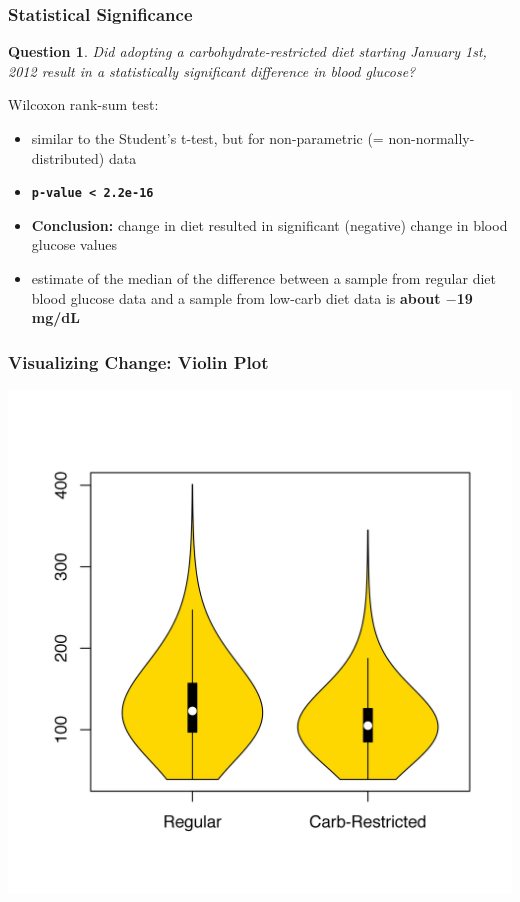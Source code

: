 \documentclass[handout]{beamer}
\newtheorem{question}{Question}
\begin{document}
\begin{frame}
  \frametitle{Statistical Significance}

  \begin{question}
     Did adopting a carbohydrate-restricted diet starting January 1st, 2012 result in a statistically significant difference in
     blood glucose?
  \end{question}
  \pause
  Wilcoxon rank-sum test:
  \begin{itemize}
  \pause
  \item similar to the Student's t-test, but for non-parametric (= non-normally-distributed) data
  \pause
  \item \textbf{\texttt{p-value < 2.2e-16}}
  \pause
  \item \textbf{Conclusion:} change in diet resulted in significant (negative) change in blood glucose values
  \pause
  \item estimate of the median of the difference between a sample from regular diet blood glucose data and a sample from low-carb
    diet data is \textbf{about $-$19 mg/dL}
  \end{itemize}

\end{frame}

\begin{frame}
  \frametitle{Visualizing Change: Violin Plot}
  
  \begin{center}
    \includegraphics[height=0.95\textheight]{dexcom_violin.jpg}
  \end{center}

\end{frame}
\end{document}
